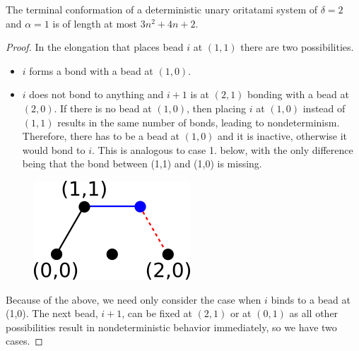 \begin{lemma}[$\delta=2, \alpha =1$]\label{lem:d2a1}
	The terminal conformation of a deterministic unary oritatami system of $\delta=2$ and $\alpha = 1$ is of length at most $3n^2+4n+2$.
\end{lemma}
\begin{proof}
In the elongation that places bead $i$ at $(1,1)$ there are two possibilities. 
\begin{itemize}
	\item $i$ forms a bond with a bead at $(1,0)$.
	\item  $i$ does not bond to anything and $i+1$ is at $(2,1)$ bonding with a bead at $(2,0)$. If there is no bead at $(1,0)$, then placing $i$ at $(1,0)$ instead of $(1,1)$ results in the same number of bonds, leading to nondeterminism. Therefore, there has to be a bead at $(1,0)$ and it is inactive, otherwise it would bond to $i$. This is analogous to case 1. below, with the only difference being that the bond between (1,1) and (1,0) is missing.%
\end{itemize}

	\begin{figure}
		\centering
		\includegraphics[width=0.2\linewidth]{./Fig/hexagonOut1}
		\label{fig:hexagonOut1}
	\end{figure}
 
Because of the above, we need only consider the case when $i$ binds to a bead at (1,0). The next bead, $i+1$, can be fixed at $(2,1)$ or at $(0,1)$ as all other possibilities result in nondeterministic behavior immediately, so we have two cases.


\end{proof}
